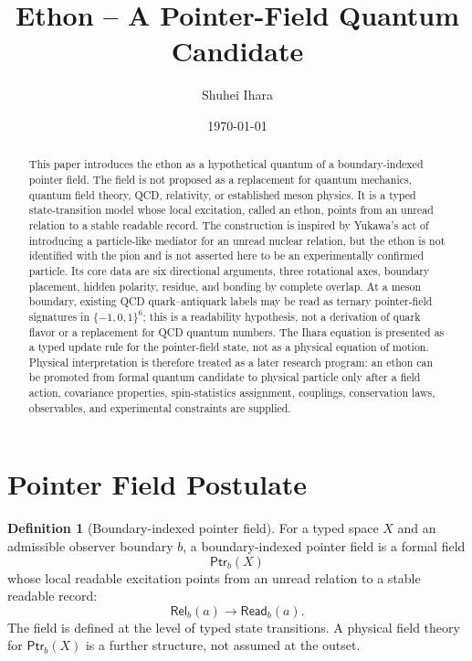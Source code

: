 \documentclass[11pt]{article}
\title{Ethon -- A Pointer-Field Quantum Candidate}
\author{Shuhei Ihara}
\date{\today}
\theoremstyle{definition}
\newtheorem{definition}{Definition}[section]
\theoremstyle{plain}
\newcommand{\Ptr}{\mathsf{Ptr}}
\newcommand{\Rel}{\mathsf{Rel}}
\newcommand{\Read}{\mathsf{Read}}
\begin{document}
\maketitle

\begin{abstract}
This paper introduces the ethon as a hypothetical quantum of a
boundary-indexed pointer field.  The field is not proposed as a
replacement for quantum mechanics, quantum field theory, QCD, relativity,
or established meson physics.  It is a typed state-transition model whose
local excitation, called an ethon, points from an unread relation to a
stable readable record.  The construction is inspired by Yukawa's act of
introducing a particle-like mediator for an unread nuclear relation, but
the ethon is not identified with the pion and is not asserted here to be
an experimentally confirmed particle.  Its core data are six directional
arguments, three rotational axes, boundary placement, hidden polarity,
residue, and bonding by complete overlap.  At a meson boundary, existing
QCD quark--antiquark labels may be read as ternary pointer-field
signatures in \(\{-1,0,1\}^{6}\); this is a readability hypothesis, not a
derivation of quark flavor or a replacement for QCD quantum numbers.  The
Ihara equation is presented as a typed update rule for the pointer-field
state, not as a physical equation of motion.  Physical interpretation is
therefore treated as a later research program: an ethon can be promoted
from formal quantum candidate to physical particle only after a field
action, covariance properties, spin-statistics assignment, couplings,
conservation laws, observables, and experimental constraints are supplied.
\end{abstract}

\tableofcontents

\section{Pointer Field Postulate}

\begin{definition}[Boundary-indexed pointer field]
For a typed space \(X\) and an admissible observer boundary \(b\), a
boundary-indexed pointer field is a formal field
\[
  \Ptr_b(X)
\]
whose local readable excitation points from an unread relation to a
stable readable record:
\[
  \Rel_b(a)\longrightarrow\Read_b(a).
\]
The field is defined at the level of typed state transitions.  A physical
field theory for \(\Ptr_b(X)\) is a further structure, not assumed at the
outset.
\end{definition}
\end{document}
